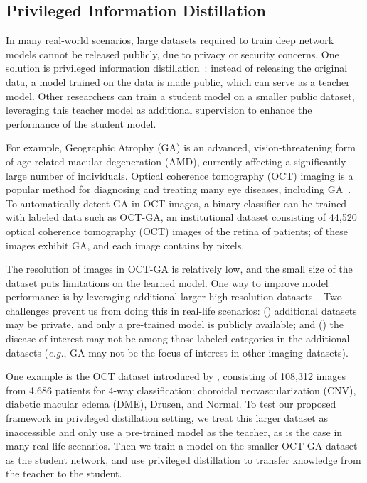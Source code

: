 \documentclass[final]{cvpr}
\theoremstyle{definition}
\begin{document}
\subsection{Privileged Information Distillation}

In many real-world scenarios, large datasets required to train deep network models cannot be released publicly, due to privacy or security concerns.
One solution is privileged information distillation~\cite{vapnik2009new}: instead of releasing the original data, a model trained on the data is made public, which can serve as a teacher model.
Other researchers can train a student model on a smaller public dataset, leveraging this teacher model as additional supervision to enhance the performance of the student model.








For example, Geographic Atrophy (GA) is an advanced, vision-threatening form of age-related macular degeneration (AMD), currently affecting a significantly large number of individuals.
Optical coherence tomography (OCT) imaging is a popular method for diagnosing and treating many eye diseases, including GA~\cite{boyer2017pathophysiology}. To automatically detect GA in OCT images, a binary classifier can be trained with labeled data such as OCT-GA, an institutional dataset consisting of 44,520 optical coherence tomography (OCT) images of the retina of  patients;  of these images exhibit GA, and each image contains  by  pixels. 



The resolution of images in OCT-GA is relatively low, and the small size of the dataset puts limitations on the learned model. One way to improve model performance is by leveraging additional larger high-resolution datasets~\cite{sun2017revisiting}.
Two challenges prevent us from doing this in real-life scenarios: () additional datasets may be private, and only a pre-trained model is publicly available; and () the disease of interest may not be among those labeled categories in the additional datasets (\emph{e.g.}, GA may not be the focus of interest in other imaging datasets). 



One example is the OCT dataset introduced by \cite{kermany2018identifying}, consisting of 108,312 images from 4,686 patients for 4-way classification: choroidal neovascularization (CNV), diabetic macular edema (DME), Drusen, and Normal.
To test our proposed framework in privileged distillation setting, we treat this larger dataset as inaccessible and only use a pre-trained model as the teacher, as is the case in many real-life scenarios. Then we train a model on the smaller OCT-GA dataset as the student network, and use privileged distillation to transfer knowledge from the teacher to the student.
\end{document}

